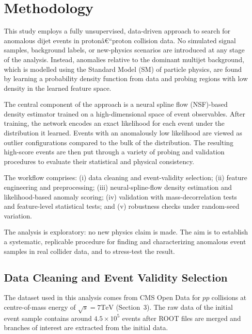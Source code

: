 \documentclass[11pt,a4paper,twocolumn]{article}
\begin{document}
\section{Methodology}

This study employs a fully unsupervised, data-driven approach to search for anomalous dijet events in protonâ€“proton collision data. No simulated signal samples, background labels, or new-physics scenarios are introduced at any stage of the analysis. Instead, anomalies relative to the dominant multijet background, which is modelled using the Standard Model (SM) of particle physics, are found by learning a probability density function from data and probing regions with low density in the learned feature space.

The central component of the approach is a neural spline flow (NSF)-based density estimator trained on a high-dimensional space of event observables. After training, the network encodes an exact likelihood for each event under the distribution it learned. Events with an anomalously low likelihood are viewed as outlier configurations compared to the bulk of the distribution. The resulting high-score events are then put through a variety of probing and validation procedures to evaluate their statistical and physical consistency.

The workflow comprises: (i) data cleaning and event-validity selection; (ii) feature engineering and preprocessing; (iii) neural-spline-flow density estimation and likelihood-based anomaly scoring; (iv) validation with mass-decorrelation tests and feature-level statistical tests; and (v) robustness checks under random-seed variation.

The analysis is exploratory: no new physics claim is made. The aim is to establish a systematic, replicable procedure for finding and characterizing anomalous event samples in real collider data, and to stress-test the result.

\subsection{Data Cleaning and Event Validity Selection}

The dataset used in this analysis comes from CMS Open Data for $pp$ collisions at centre-of-mass energy of $\sqrt{s}=7\mathrm{TeV}$ (Section~3). The raw data of the initial event sample contains around $4.5\times 10^{5}$ events after ROOT files are merged and branches of interest are extracted from the initial data.
\end{document}
